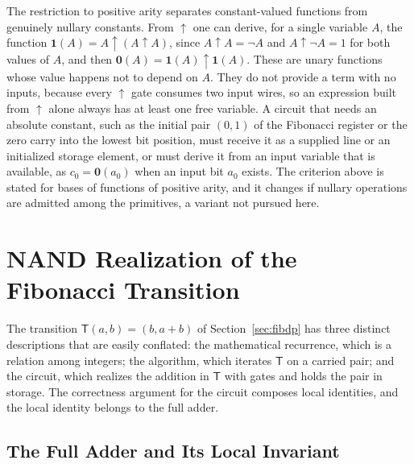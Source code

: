 \documentclass[11pt]{article}
\theoremstyle{definition}
\theoremstyle{remark}
\newcommand{\nand}{\uparrow}
\newcommand{\Tm}{\mathsf{T}}
\begin{document}
The restriction to positive arity separates constant-valued functions from genuinely nullary constants. From $\nand$ one can derive, for a single variable $A$, the function $\mathbf{1}(A) = A \nand (A \nand A)$, since $A \nand A = \neg A$ and $A \nand \neg A = 1$ for both values of $A$, and then $\mathbf{0}(A) = \mathbf{1}(A) \nand \mathbf{1}(A)$. These are unary functions whose value happens not to depend on $A$. They do not provide a term with no inputs, because every $\nand$ gate consumes two input wires, so an expression built from $\nand$ alone always has at least one free variable. A circuit that needs an absolute constant, such as the initial pair $(0,1)$ of the Fibonacci register or the zero carry into the lowest bit position, must receive it as a supplied line or an initialized storage element, or must derive it from an input variable that is available, as $c_0 = \mathbf{0}(a_0)$ when an input bit $a_0$ exists. The criterion above is stated for bases of functions of positive arity, and it changes if nullary operations are admitted among the primitives, a variant not pursued here.

\section{NAND Realization of the Fibonacci Transition}\label{sec:nand}

The transition $\Tm(a,b) = (b, a+b)$ of Section~\ref{sec:fibdp} has three distinct descriptions that are easily conflated: the mathematical recurrence, which is a relation among integers; the algorithm, which iterates $\Tm$ on a carried pair; and the circuit, which realizes the addition in $\Tm$ with gates and holds the pair in storage. The correctness argument for the circuit composes local identities, and the local identity belongs to the full adder.

\subsection{The Full Adder and Its Local Invariant}
\end{document}
